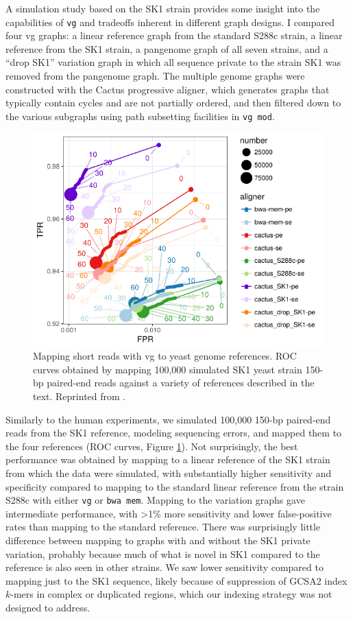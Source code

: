 A simulation study based on the SK1 strain provides some insight into the capabilities of {\tt vg} and tradeoffs inherent in different graph designs.
I compared four vg graphs: a linear reference graph from the standard S288c strain, a linear reference from the SK1 strain, a pangenome graph of all seven strains, and a ``drop SK1'' variation graph in which all sequence private to the strain SK1 was removed from the pangenome graph.
The multiple genome graphs were constructed with the Cactus progressive aligner, which generates graphs that typically contain cycles and are not partially ordered, and then filtered down to the various subgraphs using path subsetting facilities in {\tt vg mod}.

\begin{figure}[htbp!]
  \centering
  \includegraphics[width=1.0\textwidth]{Chapter3/Figs/e68fc338_test_sim_yeast_cactus-roc.pdf}
  \caption[Cactus yeast simulation]{Mapping short reads with vg to yeast genome references.
    ROC curves obtained by mapping 100,000 simulated SK1 yeast strain 150-bp paired-end reads against a variety of references described in the text.
    Reprinted from \cite{garrison2018variation}.}
  \label{fig:cactus_yeast_sim}
\end{figure}


Similarly to the human experiments, we simulated 100,000 150-bp paired-end reads from the SK1 reference, modeling sequencing errors, and mapped them to the four references (ROC curves, Figure \ref{fig:cactus_yeast_sim}).
Not surprisingly, the best performance was obtained by mapping to a linear reference of the SK1 strain from which the data were simulated, with substantially higher sensitivity and specificity compared to mapping to the standard linear reference from the strain S288c with either {\tt vg} or {\tt bwa mem}.
Mapping to the variation graphs gave intermediate performance, with >1\% more sensitivity and lower false-positive rates than mapping to the standard reference.
There was surprisingly little difference between mapping to graphs with and without the SK1 private variation, probably because much of what is novel in SK1 compared to the reference is also seen in other strains.
We saw lower sensitivity compared to mapping just to the SK1 sequence, likely because of suppression of GCSA2 index $k$-mers in complex or duplicated regions, which our indexing strategy was not designed to address.

